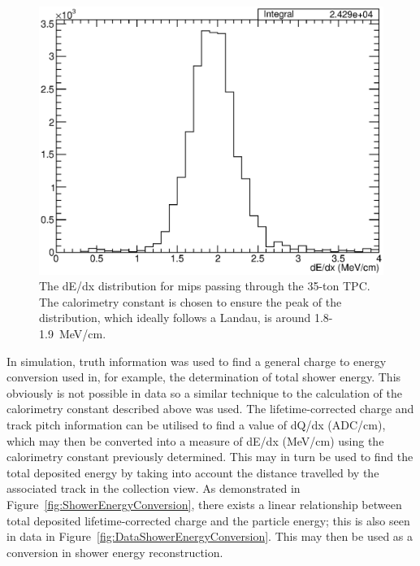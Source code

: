 \begin{figure}
  \centering
  \includegraphics[width=12cm]{dEdx.eps}
  \caption[The dE/dx distribution for mips passing through the 35-ton TPC.]{The dE/dx distribution for mips passing through the 35-ton TPC.  The calorimetry constant is chosen to ensure the peak of the distribution, which ideally follows a Landau, is around 1.8-1.9~MeV/cm.}
  \label{fig:DataCalorimetrydEdx}
\end{figure}

In simulation, truth information was used to find a general charge to energy conversion used in, for example, the determination of total shower energy.  This obviously is not possible in data so a similar technique to the calculation of the calorimetry constant described above was used.  The lifetime-corrected charge and track pitch information can be utilised to find a value of dQ/dx (ADC/cm), which may then be converted into a measure of dE/dx (MeV/cm) using the calorimetry constant previously determined.  This may in turn be used to find the total deposited energy by taking into account the distance travelled by the associated track in the collection view.   As demonstrated in Figure~\ref{fig:ShowerEnergyConversion}, there exists a linear relationship between total deposited lifetime-corrected charge and the particle energy; this is also seen in data in Figure~\ref{fig:DataShowerEnergyConversion}.  This may then be used as a conversion in shower energy reconstruction.

